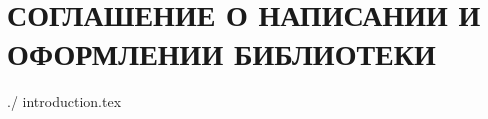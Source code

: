 \part{СОГЛАШЕНИЕ О НАПИСАНИИ И ОФОРМЛЕНИИ БИБЛИОТЕКИ}\label{logic:bib2}
	{./}	{introduction.tex}								%

\fi